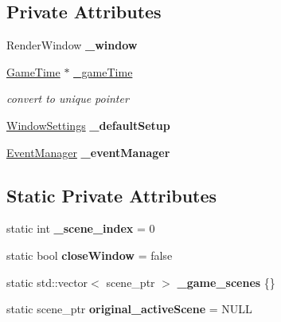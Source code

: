 \subsection*{Private Attributes}
\begin{DoxyCompactItemize}
\item 
\mbox{\label{class_game_manager_a0c8d94cc2688f7774f380bc05614695b}} 
Render\+Window {\bfseries \+\_\+window}
\item 
\mbox{\label{class_game_manager_ad5f241117fe31fc2086aa7330b7bf41a}} 
\hyperlink{class_game_time}{Game\+Time} $\ast$ \hyperlink{class_game_manager_ad5f241117fe31fc2086aa7330b7bf41a}{\+\_\+game\+Time}
\begin{DoxyCompactList}\small\item\em convert to unique pointer \end{DoxyCompactList}\item 
\mbox{\label{class_game_manager_a06843f28cb1609e41da7eee19be9aa87}} 
\hyperlink{struct_window_settings}{Window\+Settings} {\bfseries \+\_\+default\+Setup}
\item 
\mbox{\label{class_game_manager_a4b6f0c427c2efd2ec775a03a75dc8be8}} 
\hyperlink{class_event_manager}{Event\+Manager} {\bfseries \+\_\+event\+Manager}
\end{DoxyCompactItemize}
\subsection*{Static Private Attributes}
\begin{DoxyCompactItemize}
\item 
\mbox{\label{class_game_manager_aedb575ca538853f3d7053b33bef238e0}} 
static int {\bfseries \+\_\+scene\+\_\+index} = 0
\item 
\mbox{\label{class_game_manager_a07c75a9507a0d82f88a0b62d808fcf3c}} 
static bool {\bfseries close\+Window} = false
\item 
\mbox{\label{class_game_manager_ad84fda242e092622be5228019305f507}} 
static std\+::vector$<$ scene\+\_\+ptr $>$ {\bfseries \+\_\+game\+\_\+scenes} \{\}
\item 
\mbox{\label{class_game_manager_a8704a6222b652d2dc99d16102ec820bc}} 
static scene\+\_\+ptr {\bfseries original\+\_\+active\+Scene} = N\+U\+LL
\end{DoxyCompactItemize}


